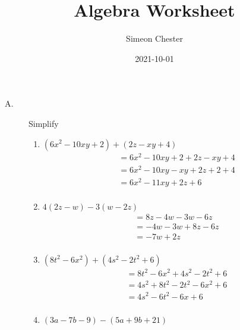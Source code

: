 \documentclass{article}
\title{Algebra Worksheet}
\author{Simeon Chester}
\date{2021-10-01}
\begin{document}
\maketitle
\begin{description}
    \item[A.]  Simplify
        \begin{enumerate}
            \item $ (6x^2 - 10xy + 2) + (2z - xy + 4)$
                  \begin{equation}
                      \begin{split}
                          & = 6x^2 - 10xy + 2 + 2z - xy + 4 \\
                          & = 6x^2 - 10xy - xy + 2z + 2 + 4 \\
                          & = 6x^2 -11xy + 2z + 6 \\
                      \end{split}
                  \end{equation}
            \item $ 4(2z-w) - 3(w-2z) $
                  \begin{equation}
                      \begin{split}
                          & = 8z - 4w -3w -6z \\
                          & = -4w - 3w + 8z - 6z \\
                          & = -7w + 2z \\
                      \end{split}
                  \end{equation}
            \item $ (8t^2 - 6x^2) + (4s^2 - 2t^2 + 6) $
                  \begin{equation}
                      \begin{split}
                          & = 8t^2 - 6x^2 + 4s^2 - 2t^2 + 6 \\
                          & = 4s^2 + 8t^2 - 2t^2 - 6x^2 + 6 \\
                          & = 4s^2 - 6t^2 - 6x + 6 \\
                      \end{split}
                  \end{equation}
            \item $ (3a - 7b - 9) - (5a + 9b + 21) $
                  \begin{equation}
                      \begin{split}

\end{split}
\end{equation}
\end{enumerate}
\end{description}
\end{document}
